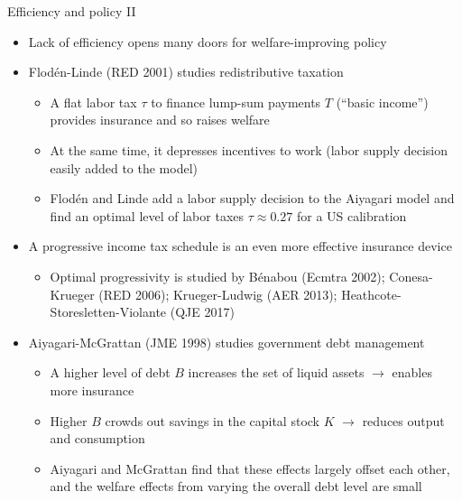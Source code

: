 \documentclass[9pt]{beamer}
\newcommand{\bit}{\begin{itemize}}
\newcommand{\eit}{\end{itemize}}
\begin{document}
\begin{frame}{Efficiency and policy II}

\bit
\setlength\itemsep{1.5em}

\item Lack of efficiency opens many doors for welfare-improving policy

\item Flod\'en-Linde (RED 2001) studies redistributive taxation
\bit
	\setlength\itemsep{0.5em}
	\item A flat labor tax $\tau$ to finance lump-sum payments $T$ (``basic income'') provides insurance and so raises welfare
	
	\item At the same time, it depresses incentives to work (labor supply decision easily added to the model)
	
	\item Flod\'en and Linde add a labor supply decision to the Aiyagari model and find an optimal level of labor taxes $\tau \approx 0.27$ for a US calibration  
\eit

\item A progressive income tax schedule is an even more effective insurance device
\bit
	\setlength\itemsep{0.5em}
	\item Optimal progressivity is studied by B\'enabou (Ecmtra 2002); Conesa-Krueger (RED 2006); Krueger-Ludwig (AER 2013); Heathcote-Storesletten-Violante (QJE 2017)
\eit


\item Aiyagari-McGrattan (JME 1998) studies government debt management
\bit
	\setlength\itemsep{0.5em}
	\item A higher level of debt $B$ increases the set of liquid assets $\rightarrow$ enables more insurance
	
	\item Higher $B$ crowds out savings in the capital stock $K$ $\rightarrow$ reduces output and consumption
	
	\item Aiyagari and McGrattan find that these effects largely offset each other, and the welfare effects from varying the overall debt level are small
\eit

\eit

\end{frame}
\end{document}
